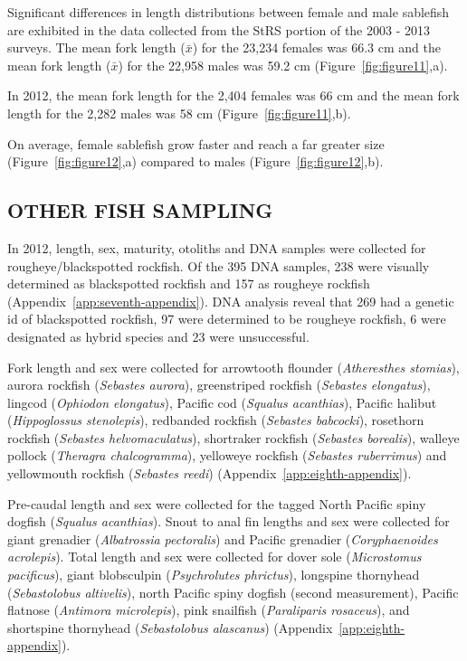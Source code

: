 \documentclass[12pt]{article}\usepackage[]{graphicx}\usepackage[]{color}
\begin{document}
Significant differences in length distributions between female and male sablefish are exhibited in the data collected from the StRS portion of the 2003 - 2013 surveys. The mean fork length (\(\bar{x}\)) for the 23,234 females was 66.3 cm and the mean fork length (\(\bar{x}\)) for the 22,958 males was 59.2 cm (Figure~\ref{fig:figure11},a).

In 2012, the mean fork length for the 2,404 females was 66 cm and the mean fork length for the 2,282 males was 58 cm (Figure~\ref{fig:figure11},b).

On average, female sablefish grow faster and reach a far greater size (Figure~\ref{fig:figure12},a) compared to males (Figure~\ref{fig:figure12},b).

\hypertarget{other-fish-sampling}{%
\subsection{OTHER FISH SAMPLING}\label{other-fish-sampling}}

In 2012, length, sex, maturity, otoliths and DNA samples were collected for rougheye/blackspotted rockfish. Of the 395 DNA samples, 238 were visually determined as blackspotted rockfish and 157 as rougheye rockfish (Appendix~\ref{app:seventh-appendix}). DNA analysis reveal that 269 had a genetic id of blackspotted rockfish, 97 were determined to be rougheye rockfish, 6 were designated as hybrid species and 23 were unsuccessful.

Fork length and sex were collected for arrowtooth flounder (\emph{Atheresthes stomias}), aurora rockfish (\emph{Sebastes aurora}), greenstriped rockfish (\emph{Sebastes elongatus}), lingcod (\emph{Ophiodon elongatus}), Pacific cod (\emph{Squalus acanthias}), Pacific halibut (\emph{Hippoglossus stenolepis}), redbanded rockfish (\emph{Sebastes babcocki}), rosethorn rockfish (\emph{Sebastes helvomaculatus}), shortraker rockfish (\emph{Sebastes borealis}), walleye pollock (\emph{Theragra chalcogramma}), yelloweye rockfish (\emph{Sebastes ruberrimus}) and yellowmouth rockfish (\emph{Sebastes reedi}) (Appendix~\ref{app:eighth-appendix}).

Pre-caudal length and sex were collected for the tagged North Pacific spiny dogfish (\emph{Squalus acanthias}). Snout to anal fin lengths and sex were collected for giant grenadier (\emph{Albatrossia pectoralis}) and Pacific grenadier (\emph{Coryphaenoides acrolepis}). Total length and sex were collected for dover sole (\emph{Microstomus pacificus}), giant blobsculpin (\emph{Psychrolutes phrictus}), longspine thornyhead (\emph{Sebastolobus altivelis}), north Pacific spiny dogfish (second measurement), Pacific flatnose (\emph{Antimora microlepis}), pink snailfish (\emph{Paraliparis rosaceus}), and shortspine thornyhead (\emph{Sebastolobus alascanus}) (Appendix~\ref{app:eighth-appendix}).
\end{document}
